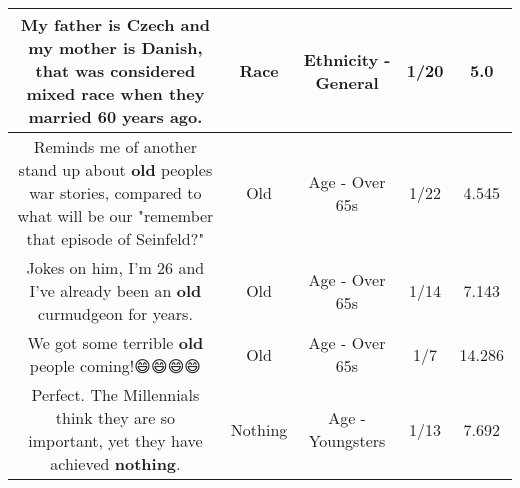 \documentclass[11pt]{article}
\newlength\mylength
\begin{document}
\begin{center}
\begin{longtable}{|C{.65\mylength}|C{.30\mylength}|C{.12\mylength}|C{.12\mylength}|C{.12\mylength}|}
  \small My father is Czech and my mother is Danish, that was considered mixed \textbf{race} when they married 60 years ago.\normalsize   & Race & Ethnicity - General & 1/20 & 5.0 \\  \hline
  \small Reminds me of another stand up about \textbf{old} peoples war stories, compared to what will be our "remember that episode of Seinfeld?"\normalsize   & Old & Age - Over 65s & 1/22 & 4.545 \\  \hline
  \small Jokes on him, I'm 26 and I've already been an \textbf{old} curmudgeon for years.\normalsize   & Old & Age - Over 65s & 1/14 & 7.143 \\  \hline
  \small We got some terrible \textbf{old} people coming!😄😄😄😄\normalsize   & Old & Age - Over 65s & 1/7 & 14.286 \\  \hline
  \small Perfect.  The Millennials think they are so important, yet they have achieved \textbf{nothing}.\normalsize   & Nothing & Age - Youngsters & 1/13 & 7.692 \\  \hline

\end{longtable}
\end{center}
\end{document}
